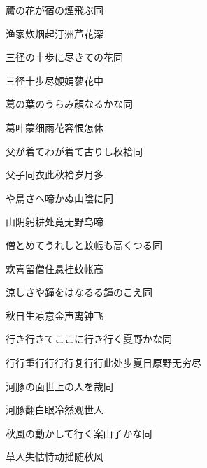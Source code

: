 \begin{haiku}
    {\FH 蘆の花が宿の煙飛ぶ}\hfill{\FH 同}

    {\FK 渔家炊烟起汀洲芦花深}
\end{haiku}

\begin{haiku}
    {\FH 三径の十歩に尽きての花}\hfill{\FH 同}

    {\FK 三径十步尽㛹娟蓼花中}
\end{haiku}

\begin{haiku}
    {\FH 葛の葉のうらみ顔なるかな}\hfill{\FH 同}

    {\FK 葛叶蒙细雨花容恨怎休}
\end{haiku}

\begin{haiku}
    {\FH 父が着てわが着て古りし秋袷}\hfill{\FH 同}

    {\FK 父子同衣此秋袷岁月多}
\end{haiku}

\begin{haiku}
    {\FH {}や鳥さへ啼かぬ山陰に}\hfill{\FH 同}

    {\FK 山阴躬耕处竟无野鸟啼}
\end{haiku}

\begin{haiku}
    {\FH 僧とめてうれしと蚊帳も高くつる}\hfill{\FH 同}

    {\FK 欢喜留僧住悬挂蚊帐高}
\end{haiku}

\begin{haiku}
    {\FH 涼しさや鐘をはなるる鐘のこえ}\hfill{\FH 同}

    {\FK 秋日生凉意金声离钟飞}
\end{haiku}

\begin{haiku}
    {\FH 行き行きてここに行き行く夏野かな}\hfill{\FH 同}

    {\FK 行行重行行行行复行行此处步夏日原野无穷尽}
\end{haiku}

\begin{haiku}
    {\FH 河豚の面世上の人を哉}\hfill{\FH 同}

    {\FK 河豚翻白眼冷然观世人}
\end{haiku}

\begin{haiku}
    {\FH 秋風の動かして行く案山子かな}\hfill{\FH 同}

    {\FK 草人失怙恃动摇随秋风}
\end{haiku}

